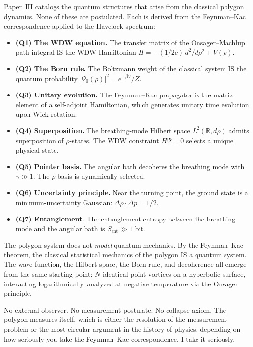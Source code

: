 Paper~III catalogs the quantum structures that arise from the
classical polygon dynamics. None of these are postulated. Each is derived
from the Feynman--Kac correspondence applied to the Havelock spectrum:

\begin{itemize}
\item \textbf{(Q1) The WDW equation.} The transfer matrix of the
  Onsager--Machlup path integral IS the WDW Hamiltonian
  $H = -(1/2c)\,d^2/d\rho^2 + V(\rho)$.
\item \textbf{(Q2) The Born rule.} The Boltzmann weight of the
  classical system IS the quantum probability
  $|\Psi_0(\rho)|^2 = e^{-\beta V}/Z$.
\item \textbf{(Q3) Unitary evolution.} The Feynman--Kac propagator is
  the matrix element of a self-adjoint Hamiltonian, which generates
  unitary time evolution upon Wick rotation.
\item \textbf{(Q4) Superposition.} The breathing-mode Hilbert space
  $L^2(\mathbb{R}, d\rho)$ admits superposition of $\rho$-states.
  The WDW constraint $H\Psi = 0$ selects a unique physical state.
\item \textbf{(Q5) Pointer basis.} The angular bath decoheres the
  breathing mode with $\gamma \gg 1$. The $\rho$-basis is
  dynamically selected.
\item \textbf{(Q6) Uncertainty principle.} Near the turning point,
  the ground state is a minimum-uncertainty Gaussian:
  $\Delta\rho \cdot \Delta p = 1/2$.
\item \textbf{(Q7) Entanglement.} The entanglement entropy between the
  breathing mode and the angular bath is $S_{\text{ent}} \gg 1$ bit.
\end{itemize}

The polygon system does not \emph{model} quantum mechanics. By the
Feynman--Kac theorem, the classical statistical mechanics of the polygon
IS a quantum system. The wave function, the Hilbert space, the Born
rule, and decoherence all emerge from the same starting point: $N$
identical point vortices on a hyperbolic surface, interacting
logarithmically, analyzed at negative temperature via the Onsager
principle.

No external observer. No measurement postulate. No collapse axiom.
The polygon measures itself, which is either the resolution of
the measurement problem or the most circular argument in the history
of physics, depending on how seriously you take the Feynman--Kac
correspondence. I take it seriously.


